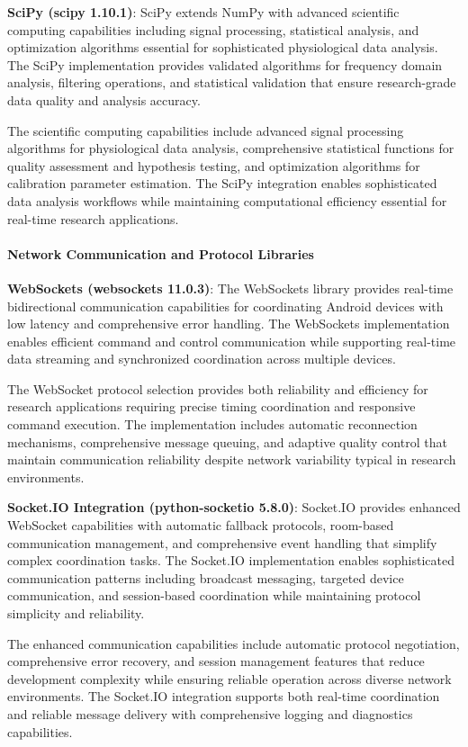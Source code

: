 \documentclass[11pt,a4paper]{report}
\begin{document}
\textbf{SciPy (scipy 1.10.1)}: SciPy extends NumPy with advanced scientific computing capabilities including signal
processing, statistical analysis, and optimization algorithms essential for sophisticated physiological data analysis.
The SciPy implementation provides validated algorithms for frequency domain analysis, filtering operations, and
statistical validation that ensure research-grade data quality and analysis accuracy.

The scientific computing capabilities include advanced signal processing algorithms for physiological data analysis,
comprehensive statistical functions for quality assessment and hypothesis testing, and optimization algorithms for
calibration parameter estimation. The SciPy integration enables sophisticated data analysis workflows while maintaining
computational efficiency essential for real-time research applications.

\paragraph{Network Communication and Protocol Libraries}

\textbf{WebSockets (websockets 11.0.3)}: The WebSockets library provides real-time bidirectional communication capabilities
for coordinating Android devices with low latency and comprehensive error handling. The WebSockets implementation
enables efficient command and control communication while supporting real-time data streaming and synchronized
coordination across multiple devices.

The WebSocket protocol selection provides both reliability and efficiency for research applications requiring precise
timing coordination and responsive command execution. The implementation includes automatic reconnection mechanisms,
comprehensive message queuing, and adaptive quality control that maintain communication reliability despite network
variability typical in research environments.

\textbf{Socket.IO Integration (python-socketio 5.8.0)}: Socket.IO provides enhanced WebSocket capabilities with automatic
fallback protocols, room-based communication management, and comprehensive event handling that simplify complex
coordination tasks. The Socket.IO implementation enables sophisticated communication patterns including broadcast
messaging, targeted device communication, and session-based coordination while maintaining protocol simplicity and
reliability.

The enhanced communication capabilities include automatic protocol negotiation, comprehensive error recovery, and
session management features that reduce development complexity while ensuring reliable operation across diverse network
environments. The Socket.IO integration supports both real-time coordination and reliable message delivery with
comprehensive logging and diagnostics capabilities.
\end{document}
